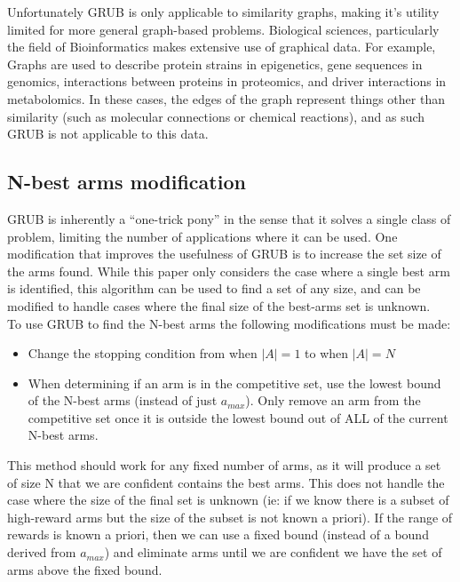 \documentclass{article}[12pt]
\begin{document}
Unfortunately GRUB is only applicable to similarity graphs, making it’s utility limited for more general graph-based problems.
Biological sciences, particularly the field of Bioinformatics makes extensive use of graphical data.
For example, Graphs are used to describe protein strains in epigenetics, gene sequences in genomics, interactions between proteins in proteomics, and driver interactions in metabolomics.
In these cases, the edges of the graph represent things other than similarity (such as molecular connections or chemical reactions), and as such GRUB is not applicable to this data.

\subsection{N-best arms modification}

GRUB is inherently a ``one-trick pony'' in the sense that it solves a single class of problem, limiting the number of applications where it can be used.
One modification that improves the usefulness of GRUB is to increase the set size of the arms found.
While this paper only considers the case where a single best arm is identified, this algorithm can be used to find a set of any size,
and can be modified to handle cases where the final size of the best-arms set is unknown. \\

To use GRUB to find the N-best arms the following modifications must be made:
\begin{itemize}
    \item Change the stopping condition from when $|A|=1$ to when $|A|=N$
    \item When determining if an arm is in the competitive set, use the lowest bound of the N-best arms (instead of just $a_{max}$).
    Only remove an arm from the competitive set once it is outside the lowest bound out of ALL of the current N-best arms.
\end{itemize}

This method should work for any fixed number of arms, as it will produce a set of size N that we are confident contains the best arms.
This does not handle the case where the size of the final set is unknown
(ie: if we know there is a subset of high-reward arms but the size of the subset is not known a priori).
If the range of rewards is known a priori, then we can use a fixed bound (instead of a bound derived from $a_{max}$) and eliminate arms until we are confident we have the set of arms above the fixed bound.
\end{document}

